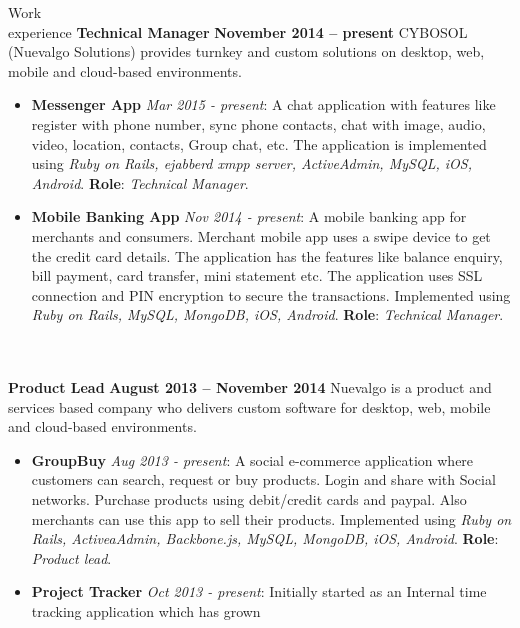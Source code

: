\documentclass{resume}
\begin{document}
\begin{category}{Work \\experience}
  \citemnobullet \textbf{Technical Manager} \hfill \textbf{November 2014 -- present}
  \citemnobullet CYBOSOL (Nuevalgo Solutions) provides turnkey and custom solutions on desktop, web, mobile and cloud-based environments.
  \begin{itemize}
  \item \textbf{Messenger App} {\em Mar 2015 - present}: A chat
    application with features like register with phone number, sync
    phone contacts, chat with image, audio, video, location, contacts,
    Group chat, etc. The application is implemented using {\em Ruby on
      Rails, ejabberd xmpp server, ActiveAdmin, MySQL, iOS,
      Android}. \textbf{Role}: {\em Technical Manager}. 
  \item \textbf{Mobile Banking App} {\em Nov 2014 - present}: A mobile
    banking app for merchants and consumers. Merchant mobile app uses
    a swipe device to get the credit card details. The application has
    the features like balance enquiry, bill payment, card transfer,
    mini statement etc. The application uses SSL connection and PIN
    encryption to secure the transactions. Implemented using {\em Ruby
      on Rails, MySQL, MongoDB, iOS, Android}. \textbf{Role}: {\em
      Technical Manager}.\\\\\\ 
  \end{itemize}
  \citemnobullet \textbf{Product Lead} \hfill \textbf{August 2013 -- November 2014}
  \citemnobullet Nuevalgo is a product and services based company who delivers custom software for desktop, web, mobile and cloud-based environments.
  \begin{itemize}
  \item \textbf{GroupBuy} {\em Aug 2013 - present}: A social
    e-commerce application where customers can search, request or buy
    products. Login and share with Social networks. Purchase products
    using debit/credit cards and paypal. Also merchants can use this
    app to sell their products. Implemented using {\em Ruby on Rails,
      ActiveaAdmin, Backbone.js, MySQL, MongoDB, iOS, Android}. \textbf{Role}: {\em Product lead}. 
  \item \textbf{Project Tracker} {\em Oct 2013 - present}: Initially
    started as an Internal time tracking application which has grown

\end{itemize}
\end{category}
\end{document}

